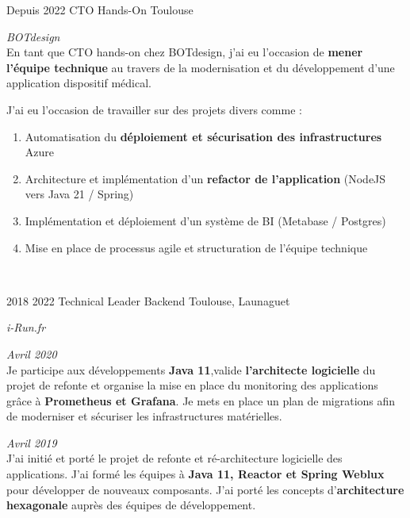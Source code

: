 \documentclass{friggeri-cv} 	%
\begin{document}
\begin{entrylist}
\entry
{Depuis 2022}
{CTO Hands-On}
{Toulouse}
{\vspace{-0.2cm}\emph{BOTdesign} \\

En tant que CTO hands-on chez BOTdesign, j’ai eu l’occasion de \textbf{mener l’équipe technique} au travers de la modernisation et du développement 
d'une application dispositif médical.

J’ai eu l’occasion de travailler sur des projets divers comme :
\begin{enumerate}
    \item Automatisation du \textbf{déploiement et sécurisation des infrastructures} Azure
    \item Architecture et implémentation d’un \textbf{refactor de l’application} (NodeJS vers Java 21 / Spring)
    \item Implémentation et déploiement d’un système de BI (Metabase / Postgres)
    \item Mise en place de processus agile et structuration de l’équipe technique
\end{enumerate}

\
}

\entry
{2018  2022}
{Technical Leader Backend}
{Toulouse, Launaguet}
{\vspace{-0.4cm}\emph{i-Run.fr} \\
\begin{description}[leftmargin=0cm]
    \item [\hspace*{-1cm}\bodyfont{|} \normalfont \textbf{\color{orange}CTO \color{headercolor}Adjoint}] \hfill \textit{Avril 2020}\\
        Je participe aux développements \textbf{Java 11},valide \textbf{l’architecte logicielle} du projet de refonte et organise la mise en place 
        du monitoring des applications grâce à \textbf{Prometheus et Grafana}. Je mets en place un plan de migrations afin de moderniser et sécuriser
        les infrastructures matérielles. 

    \item [\hspace*{-1cm}\bodyfont{|} \normalfont \textbf{\color{orange}Responsable \color{headercolor}Technique}] \hfill \textit{Avril 2019}\\
        J’ai initié et porté le projet de refonte et ré-architecture logicielle des applications. J’ai formé les équipes 
        à \textbf{Java 11, Reactor et Spring Weblux} pour développer de nouveaux composants. 
        J’ai porté les concepts d’\textbf{architecture hexagonale} auprès des équipes de développement.


\end{description}}
\end{entrylist}
\end{document}
